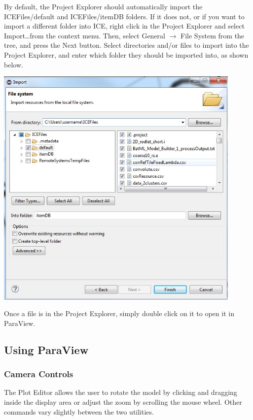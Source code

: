 \documentclass{article}
\begin{document}
By default, the Project Explorer should automatically import the
ICEFiles/default and ICEFiles/itemDB folders. If it does not, or if you want to
import a different folder into ICE, right click in the Project Explorer and
select Import\ldots from the context menu. Then, select General $\rightarrow$
File System from the tree, and press the Next button. Select directories and/or
files to import into the Project Explorer, and enter which folder they should
be imported into, as shown below.

\begin{center}
\includegraphics[width=12cm]{images/ImportFileDialog}
\end{center}

Once a file is in the Project Explorer, simply double click on it to open it in
ParaView.

\subsection{Using ParaView}

\subsubsection{Camera Controls}

The Plot Editor allows the user to rotate the model by clicking and dragging
inside the display area or adjust the zoom by scrolling the mouse wheel. Other
commands vary slightly between the two utilities.
\end{document}

